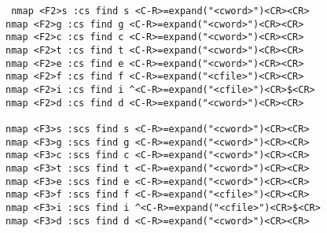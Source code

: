 \begin{verbatim}
 nmap <F2>s :cs find s <C-R>=expand("<cword>")<CR><CR>
nmap <F2>g :cs find g <C-R>=expand("<cword>")<CR><CR>
nmap <F2>c :cs find c <C-R>=expand("<cword>")<CR><CR>
nmap <F2>t :cs find t <C-R>=expand("<cword>")<CR><CR>
nmap <F2>e :cs find e <C-R>=expand("<cword>")<CR><CR>
nmap <F2>f :cs find f <C-R>=expand("<cfile>")<CR><CR>
nmap <F2>i :cs find i ^<C-R>=expand("<cfile>")<CR>$<CR>
nmap <F2>d :cs find d <C-R>=expand("<cword>")<CR><CR>

nmap <F3>s :scs find s <C-R>=expand("<cword>")<CR><CR>
nmap <F3>g :scs find g <C-R>=expand("<cword>")<CR><CR>
nmap <F3>c :scs find c <C-R>=expand("<cword>")<CR><CR>
nmap <F3>t :scs find t <C-R>=expand("<cword>")<CR><CR>
nmap <F3>e :scs find e <C-R>=expand("<cword>")<CR><CR>
nmap <F3>f :scs find f <C-R>=expand("<cfile>")<CR><CR>
nmap <F3>i :scs find i ^<C-R>=expand("<cfile>")<CR>$<CR>
nmap <F3>d :scs find d <C-R>=expand("<cword>")<CR><CR>

\end{verbatim}









